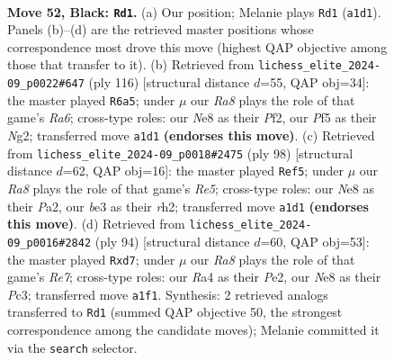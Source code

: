\documentclass[11pt]{article}
\begin{document}
\clearpage

\begin{figure}[p]\centering
\begin{subfigure}{0.46\textwidth}\centering
\resizebox{\linewidth}{!}{%
\newchessgame
\chessboard[
  setfen={4n3/p1p1k3/8/5p2/r4P1R/4B3/1K5P/r4BR1 b - - 9 52},
  showmover=false,
  pgfstyle=straightmove, color=movearrow, markmove={a1-d1}
]}
\caption{}
\end{subfigure}\hfill
\begin{subfigure}{0.46\textwidth}\centering
\resizebox{\linewidth}{!}{%
\newchessgame
\chessboard[
  setfen={r7/Pk6/R1p3p1/5bPp/1r6/8/5PNK/R7 w - - 15 59},
  showmover=false,
  pgfstyle=straightmove, color=movearrow, markmove={a6-a5}
]}
\caption{}
\end{subfigure}
\\[4pt]
\begin{subfigure}{0.46\textwidth}\centering
\resizebox{\linewidth}{!}{%
\newchessgame
\chessboard[
  setfen={8/2pbk1p1/2p1r3/4R1P1/4P3/1P1NK3/P6r/5R2 w - - 11 50},
  showmover=false,
  pgfstyle=straightmove, color=movearrow, markmove={e5-f5}
]}
\caption{}
\end{subfigure}\hfill
\begin{subfigure}{0.46\textwidth}\centering
\resizebox{\linewidth}{!}{%
\newchessgame
\chessboard[
  setfen={5r2/pr1bR1R1/2p2k2/2p2p1B/5K2/P1P5/4P3/8 w - - 6 48},
  showmover=false,
  pgfstyle=straightmove, color=movearrow, markmove={e7-d7}
]}
\caption{}
\end{subfigure}
\caption{\textbf{Move 52, Black: \texttt{Rd1}.} (a) Our position; Melanie plays \texttt{Rd1} (\texttt{a1d1}). Panels (b)--(d) are the retrieved master positions whose correspondence most drove this move (highest QAP objective among those that transfer to it). (b) Retrieved from \texttt{lichess\_elite\_2024-09\_p0022\#647} (ply 116) [structural distance $d$=55, QAP obj=34]: the master played \texttt{R6a5}; under $\mu$ our \emph{Ra8} plays the role of that game's \emph{Ra6}; cross-type roles: our \emph{N}e8 as their \emph{P}f2, our \emph{P}f5 as their \emph{N}g2; transferred move \texttt{a1d1} \textbf{(endorses this move)}. (c) Retrieved from \texttt{lichess\_elite\_2024-09\_p0018\#2475} (ply 98) [structural distance $d$=62, QAP obj=16]: the master played \texttt{Ref5}; under $\mu$ our \emph{Ra8} plays the role of that game's \emph{Re5}; cross-type roles: our \emph{N}e8 as their \emph{P}a2, our \emph{b}e3 as their \emph{r}h2; transferred move \texttt{a1d1} \textbf{(endorses this move)}. (d) Retrieved from \texttt{lichess\_elite\_2024-09\_p0016\#2842} (ply 94) [structural distance $d$=60, QAP obj=53]: the master played \texttt{Rxd7}; under $\mu$ our \emph{Ra8} plays the role of that game's \emph{Re7}; cross-type roles: our \emph{R}a4 as their \emph{P}e2, our \emph{N}e8 as their \emph{P}c3; transferred move \texttt{a1f1}. Synthesis: 2 retrieved analogs transferred to \texttt{Rd1} (summed QAP objective 50, the strongest correspondence among the candidate moves); Melanie committed it via the \texttt{search} selector.}
\label{fig:thought-m103}
\end{figure}
\end{document}
